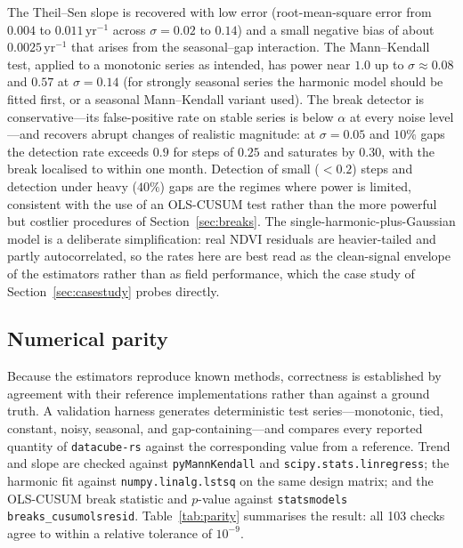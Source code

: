 \documentclass[review]{elsarticle}
\begin{document}
The Theil--Sen slope is recovered with low error (root-mean-square error from
$0.004$ to $0.011\,\mathrm{yr}^{-1}$ across $\sigma = 0.02$ to $0.14$) and a
small negative bias of about $0.0025\,\mathrm{yr}^{-1}$ that arises from the
seasonal--gap interaction. The Mann--Kendall test, applied to a monotonic series
as intended, has power near $1.0$ up to $\sigma \approx 0.08$ and $0.57$ at
$\sigma = 0.14$ (for strongly seasonal series the harmonic model should be fitted
first, or a seasonal Mann--Kendall variant used). The break detector is
conservative---its false-positive rate on stable series is below $\alpha$ at
every noise level---and recovers abrupt changes of realistic magnitude: at
$\sigma = 0.05$ and $10\%$ gaps the detection rate exceeds $0.9$ for steps of
$0.25$ and saturates by $0.30$, with the break localised to within one month.
Detection of small ($<0.2$) steps and detection under heavy ($40\%$) gaps are
the regimes where power is limited, consistent with the use of an OLS-CUSUM test
rather than the more powerful but costlier procedures of
Section~\ref{sec:breaks}. The single-harmonic-plus-Gaussian model is a
deliberate simplification: real NDVI residuals are heavier-tailed and partly
autocorrelated, so the rates here are best read as the clean-signal envelope of
the estimators rather than as field performance, which the case study of
Section~\ref{sec:casestudy} probes directly.

\subsection{Numerical parity}
\label{sec:parity}
Because the estimators reproduce known methods, correctness is established by
agreement with their reference implementations rather than against a ground
truth. A validation harness generates deterministic test series---monotonic,
tied, constant, noisy, seasonal, and gap-containing---and compares every
reported quantity of \texttt{datacube-rs} against the corresponding value from a
reference. Trend and slope are checked against \texttt{pyMannKendall}
\citep{hussain2019pymannkendall} and \texttt{scipy.stats.linregress}; the
harmonic fit against \texttt{numpy.linalg.lstsq} on the same design matrix; and
the OLS-CUSUM break statistic and $p$-value against
\texttt{statsmodels} \texttt{breaks\_cusumolsresid}. Table~\ref{tab:parity}
summarises the result: all 103 checks agree to within a relative tolerance of
$10^{-9}$.
\end{document}

